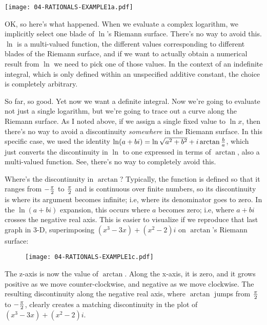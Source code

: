 \begin{center}
\texttt{[image: 04-RATIONALS-EXAMPLE1a.pdf]}
\end{center}

OK, so here's what happened.  When we evaluate a complex logarithm, we
implicitly select one blade of $\ln$'s Riemann surface.  There's no
way to avoid this.  $\ln$ is a multi-valued function, the different
values corresponding to different blades of the Riemann surface, and
if we want to actually obtain a numerical result from $\ln$ we need to
pick one of those values.  In the context of an indefinite integral,
which is only defined within an unspecified additive constant, the
choice is completely arbitrary.

So far, so good.  Yet now we want a definite integral.  Now we're
going to evaluate not just a single logarithm, but we're going to
trace out a curve along the Riemann surface.  As I noted above, if we
assign a single fixed value to $\ln x$, then there's no way to avoid a
discontinuity {\it somewhere} in the Riemann surface.  In this
specific case, we used the identity $\ln(a+bi) = \ln\sqrt{a^2+b^2}
+i\arctan{b\over a}$, which just converts the discontinuity in $\ln$
to one expressed in terms of $\arctan$, also a multi-valued function.
See, there's no way to completely avoid this.

Where's the discontinuity in $\arctan$?  Typically, the function is
defined so that it ranges from $-{\pi\over2}$ to ${\pi\over2}$ and is
continuous over finite numbers, so its discontinuity is where its
argument becomes infinite; i.e, where its denominator goes to zero.
In the $\ln(a+bi)$ expansion, this occurs where $a$ becomes zero; i.e,
where $a+bi$ crosses the negative real axis.  This is easier to visualize
if we reproduce that last graph in 3-D, superimposing $(x^3-3x)+(x^2-2)i$
on $\arctan$'s Riemann surface:

\begin{figure}[h]
\begin{center}
\texttt{[image: 04-RATIONALS-EXAMPLE1c.pdf]}
\end{center}
\end{figure}

The z-axis is now the value of $\arctan$.  Along the x-axis, it is
zero, and it grows positive as we move counter-clockwise, and negative
as we move clockwise.  The resulting discontinuity along the negative
real axis, where $\arctan$ jumps from $\pi\over2$ to $-{\pi\over2}$,
clearly creates a matching discontinuity in the plot of
$(x^3-3x)+(x^2-2)i$.

